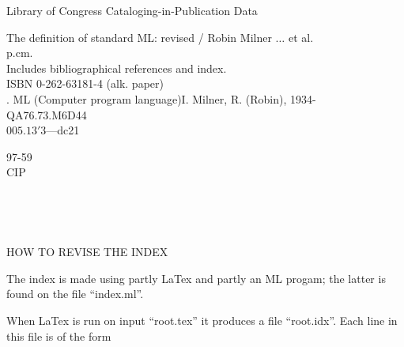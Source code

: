 \noindent
Library of Congress Cataloging-in-Publication Data
\medskip
\begin{flushleft}
The definition of standard ML: revised / Robin Milner $\ldots$ et al.\\
\quad\quad p.\quad cm.\\
\quad Includes bibliographical references and index.\\
\quad ISBN 0-262-63181-4 (alk. paper)\\
. ML (Computer program language)\quad I. Milner, R. (Robin), 1934-\\
QA76.73.M6D44\\
$005.13'3$---dc21
\end{flushleft}
\begin{flushright}
97-59\\
CIP
\end{flushright}
\clearpage
\pagestyle{headings}
\thispagestyle{empty}
\setcounter{page}{5}
\renewcommand{\thepage}{\roman{page}}
\tableofcontents
\clearpage
\pagestyle{empty}
\ \clearpage
\pagestyle{myheadings}
\pagestyle{empty}

\clearpage
\pagestyle{empty}
\ \clearpage
\pagestyle{headings}
\setcounter{page}{1}
\renewcommand{\thepage}{\arabic{page}}
\thispagestyle{empty}

\thispagestyle{empty}

\thispagestyle{empty}

\thispagestyle{empty}

\thispagestyle{empty}

\thispagestyle{empty}

\thispagestyle{empty}

\thispagestyle{empty}

\appendix
\thispagestyle{empty}

\blankPage
\thispagestyle{empty}

\blankPage
\thispagestyle{empty}

\blankPage
\thispagestyle{empty}

\blankPage
\thispagestyle{empty}

\thispagestyle{empty}

\blankPage
\thispagestyle{empty}

\blankPage
{}
\thispagestyle{empty}

\clearpage
\blankPage
\thispagestyle{empty}



 HOW TO REVISE THE INDEX 

The index is made using partly LaTex and partly an ML progam;
the latter is found on the file ``index.ml''. 

When LaTex is run on input ``root.tex'' it produces a file ``root.idx''.
Each line in this file is of the form


